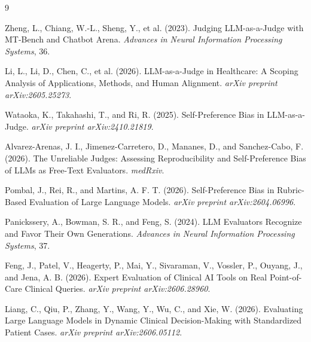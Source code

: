 \documentclass[11pt]{article}
\begin{document}
\begin{thebibliography}{9}

Zheng, L., Chiang, W.-L., Sheng, Y., et al. (2023).
Judging LLM-as-a-Judge with MT-Bench and Chatbot Arena.
\emph{Advances in Neural Information Processing Systems}, 36.

Li, L., Li, D., Chen, C., et al. (2026).
LLM-as-a-Judge in Healthcare: A Scoping Analysis of Applications, Methods, and
Human Alignment. \emph{arXiv preprint arXiv:2605.25273}.

Wataoka, K., Takahashi, T., and Ri, R. (2025).
Self-Preference Bias in LLM-as-a-Judge.
\emph{arXiv preprint arXiv:2410.21819}.

Alvarez-Arenas, J. I., Jimenez-Carretero, D., Mananes, D., and
Sanchez-Cabo, F. (2026).
The Unreliable Judges: Assessing Reproducibility and Self-Preference Bias of
LLMs as Free-Text Evaluators. \emph{medRxiv}.

Pombal, J., Rei, R., and Martins, A. F. T. (2026).
Self-Preference Bias in Rubric-Based Evaluation of Large Language Models.
\emph{arXiv preprint arXiv:2604.06996}.

Panickssery, A., Bowman, S. R., and Feng, S. (2024).
LLM Evaluators Recognize and Favor Their Own Generations.
\emph{Advances in Neural Information Processing Systems}, 37.

Feng, J., Patel, V., Heagerty, P., Mai, Y., Sivaraman, V., Vossler, P.,
Ouyang, J., and Jena, A. B. (2026).
Expert Evaluation of Clinical AI Tools on Real Point-of-Care Clinical Queries.
\emph{arXiv preprint arXiv:2606.28960}.

Liang, C., Qiu, P., Zhang, Y., Wang, Y., Wu, C., and Xie, W. (2026).
Evaluating Large Language Models in Dynamic Clinical Decision-Making with
Standardized Patient Cases. \emph{arXiv preprint arXiv:2606.05112}.

\end{thebibliography}
\end{document}
